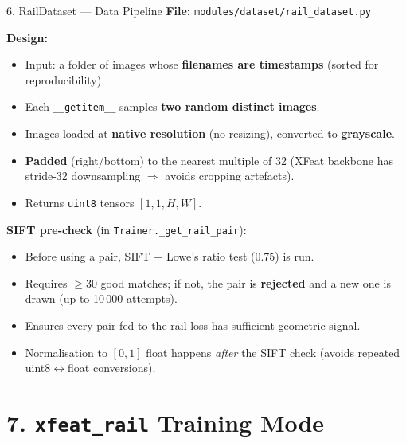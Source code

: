 \documentclass[aspectratio=169, 12pt]{beamer}
\begin{document}
\begin{frame}{6. RailDataset --- Data Pipeline}
\small
\textbf{File:} \texttt{modules/dataset/rail\_dataset.py}

\medskip
\textbf{Design:}
\begin{itemize}\setlength{\itemsep}{2pt}
    \item Input: a folder of images whose \textbf{filenames are timestamps}
          (sorted for reproducibility).
    \item Each \texttt{\_\_getitem\_\_} samples \textbf{two random distinct images}.
    \item Images loaded at \textbf{native resolution} (no resizing), converted to \textbf{grayscale}.
    \item \textbf{Padded} (right/bottom) to the nearest multiple of 32
          (XFeat backbone has stride-32 downsampling $\Rightarrow$ avoids cropping artefacts).
    \item Returns \texttt{uint8} tensors $[1,1,H,W]$.
\end{itemize}

\medskip
\textbf{SIFT pre-check} (in \texttt{Trainer.\_get\_rail\_pair}):
\begin{itemize}\setlength{\itemsep}{1pt}
    \item Before using a pair, SIFT + Lowe's ratio test (0.75) is run.
    \item Requires $\ge 30$ good matches; if not, the pair is \textbf{rejected}
          and a new one is drawn (up to 10\,000 attempts).
    \item Ensures every pair fed to the rail loss has sufficient geometric signal.
    \item Normalisation to $[0, 1]$ float happens \emph{after} the SIFT check
          (avoids repeated uint8$\leftrightarrow$float conversions).
\end{itemize}
\end{frame}


\section{7. \texttt{xfeat\_rail} Training Mode}
\end{document}
